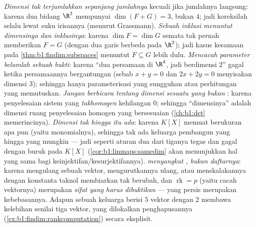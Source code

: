 \begin{remark}
\label{rem:b1:findim:pitfalls}
\emph{Dimensi tak terjumlahkan sepanjang jumlahnya} kecuali jika jumlahnya langsung:
karena dua bidang $\R^3$ mempunyai $\dim(F + G) = 3$, bukan $4$; jadi koreksilah selalu
lewat suku irisannya (menurut Grassmann).
\emph{Sebuah inklusi menuntut dimensinya \emph{dan} inklusinya}:
karena $\dim F = \dim G$ semata tak pernah memberikan $F = G$ (dengan dua garis berbeda
pada $\R^2$); jadi kasus kesamaan pada
\cref{thm:b1:findim:subspaces} menuntut $F \subseteq G$ lebih dulu.
\emph{Mencacah parameter belumlah sebuah bukti}: karena ``dua persamaan di
$\R^4$, jadi berdimensi $2$'' gagal ketika persamaannya
bergantungan (sebab $x + y = 0$ dan $2x + 2y = 0$ menyisakan dimensi $3$);
sehingga hanya parameterisasi yang sungguhan atau perhitungan  yang memutuskan.
\emph{Jangan berbicara tentang dimensi sesuatu yang bukan }: karena 
penyelesaian sistem yang \emph{takhomogen} kehilangan $0$; sehingga ``dimensinya''
adalah dimensi ruang penyelesaian homogen yang bersesuaian
(\cref{ch:b1:det} memerincinya).
\emph{Dimensi tak hingga itu ada}: karena $K[X]$ memuat 
berukuran apa pun (yaitu monomialnya), sehingga tak ada keluarga pembangun yang hingga
yang mungkin --- jadi  seperti aturan dua dari tiganya
tegas  dan gagal dengan buruk pada $K[X]$
(\cref{cor:b1:linmaps:samedim} akan menunjukkan hal yang sama bagi
keinjektifan/kesurjektifannya).
\emph{ menyangkut , bukan daftarnya}: karena mengulang sebuah vektor,
mengurutkannya ulang, atau menskalakannya dengan konstanta taknol membiarkan 
tak berubah, dan $\operatorname{rk} = p$ (yaitu cacah vektornya)
merupakan \emph{sifat yang harus dibuktikan} --- yang persis merupakan kebebasannya. Adapun
sebuah keluarga berisi $5$ vektor dengan  $2$ membawa kelebihan senilai tiga
vektor, yang dilokalkan penghapusannya
(\cref{ex:b1:findim:rankcomputation}) secara eksplisit.
\end{remark}


